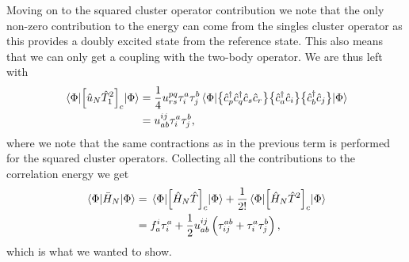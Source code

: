         Moving on to the squared cluster operator contribution we note that the
        only non-zero contribution to the energy can come from the singles
        cluster operator as this provides a doubly excited state from the
        reference state.
        This also means that we can only get a coupling with the two-body
        operator.
        We are thus left with
        \begin{align}
            \mel*{\Phi}{
                \left[ 
                    \hat{u}_N \hat{T}_1^2
                 \right]_c
            }{\Phi}
            &=
            \frac{1}{4}u^{pq}_{rs}\tau^{a}_{i}\tau^{b}_{j}
            \mel*{\Phi}{
                \bigl\{ 
                    \hat{c}_{p}^{\dagger}
                    \hat{c}_{q}^{\dagger}
                    \hat{c}_{s}
                    \hat{c}_{r}
                 \bigr\}
                \bigl\{ 
                    \hat{c}_{a}^{\dagger}
                    \hat{c}_{i}
                 \bigr\}
                \bigl\{ 
                    \hat{c}_{b}^{\dagger}
                    \hat{c}_{j}
                 \bigr\}
            }{\Phi}
            \\
            &=
            u^{ij}_{ab}\tau^{a}_{i}\tau^{b}_{j},
        \end{align}
        where we note that the same contractions as in the previous term is
        performed for the squared cluster operators.
        Collecting all the contributions to the correlation energy we get
        \begin{align}
            \mel*{\Phi}{\bar{H}_N}{\Phi}
            &=
            \mel*{\Phi}{
                \left[ 
                    \hat{H}_N\hat{T}
                 \right]_{c}
            }{\Phi}
            + \frac{1}{2!}
            \mel*{\Phi}{
                \left[ 
                    \hat{H}_N\hat{T}^2
                 \right]_{c}
            }{\Phi}
            \\
            &=
            f^{i}_{a}\tau^{a}_{i}
            + \frac{1}{2} u^{ij}_{ab}\left( 
                \tau^{ab}_{ij}
                + \tau^{a}_{i}\tau^{b}_{j}
             \right),
        \end{align}
        which is what we wanted to show.

